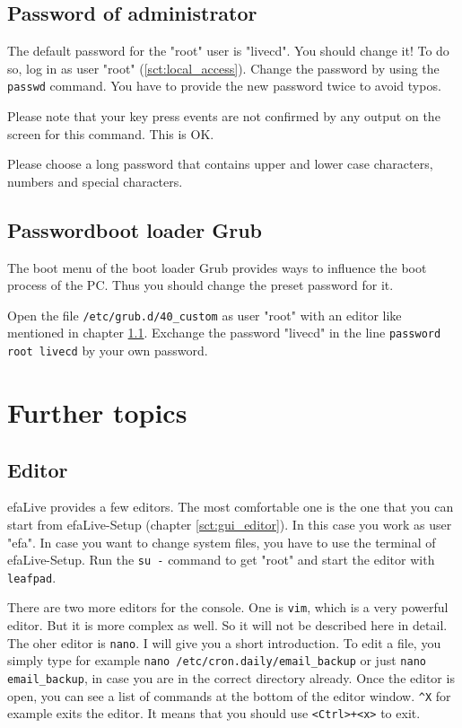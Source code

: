 \documentclass[a4paper,12pt,twoside]{article}
\begin{document}
\subsection{Password of administrator}
\label{sct:password_admin}
The default password for the "root" user is
"livecd". You should change it! To do so,
log in as user "root" (\ref{sct:local_access}). Change the
password by using the \texttt{passwd} command. You
have to provide the new password twice to avoid typos.

Please note that your key press events are not confirmed by any output
on the screen for this command. This is OK.

Please choose a long password that contains upper and lower case
characters, numbers and special characters.


\subsection{Passwordboot loader Grub}
\label{sct:password_grub}
The boot menu of the boot loader Grub \cite{GRB1} provides ways to
influence the boot process of the PC. Thus you should change the preset
password for it.

Open the file \texttt{/etc/grub.d/40\_custom} as user
"root" with an editor like mentioned in
chapter \ref{sct:editor}. Exchange the password "livecd"
in the line \texttt{password root livecd} by your
own password.


\section{Further topics}
\label{sct:further_topics}
\subsection{Editor}
\label{sct:editor}
efaLive provides a few editors. The
most comfortable one is the one that you can start from efaLive-Setup
(chapter \ref{sct:gui_editor}). In this case you work as user
"efa". In case you want to change system
files, you have to use the terminal of efaLive-Setup. Run the
\texttt{su -} command to get
"root" and start the editor with
\texttt{leafpad}. 

There are two more editors for the console. One is
\texttt{vim}, which is a very powerful editor. But
it is more complex as well. So it will not be described here in detail.
The oher editor is \texttt{nano}. I will give you
a short introduction. To edit a file, you simply type for example
\texttt{nano /etc/cron.daily/email\_backup} or
just \texttt{nano email\_backup}, in case you are
in the correct directory already. Once the editor is open, you can see
a list of commands at the bottom of the editor window.
\texttt{\^{}X} for example exits the editor. It
means that you should use
\texttt{{\textless}Ctrl{\textgreater}+{\textless}x{\textgreater}} to exit.
\end{document}
